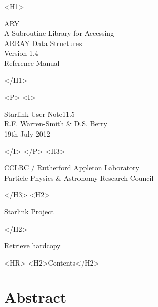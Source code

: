 \documentclass[twoside,11pt]{article}
\newcommand{\stardoccategory}  {Starlink User Note}
\newcommand{\stardocsource}    {sun\stardocnumber}
\newcommand{\stardocnumber}    {11.5}
\newcommand{\stardocauthors}   {R.F. Warren-Smith \& D.S. Berry}
\newcommand{\stardocdate}      {19th July 2012}
\newcommand{\stardoctitle}     {ARY\\[\latex{2.5ex}]
                                A Subroutine Library for Accessing\\
                                ARRAY Data Structures}
\newcommand{\stardocversion}   {Version 1.4}
\newcommand{\stardocmanual}    {Reference Manual}
\newcommand{\htmladdnormallink}[2]{#1}
\newcommand{\htmladdimg}[1]{}
\newcommand{\htmlref}[2]{#1}
\newcommand{\htmladdtonavigation}[1]{}
\newcommand{\xlabel}[1]{}
\newcommand{\latex}[1]{#1}
\newcommand{\latexonlytoc}[0]{\tableofcontents}
\begin{document}
\begin{htmlonly}
   \xlabel{}
   \begin{rawhtml} <H1> \end{rawhtml}
      \stardoctitle\\
      \stardocversion\\
      \stardocmanual
   \begin{rawhtml} </H1> \end{rawhtml}


   \begin{rawhtml} <P> <I> \end{rawhtml}
   \stardoccategory \stardocnumber \\
   \stardocauthors \\
   \stardocdate
   \begin{rawhtml} </I> </P> <H3> \end{rawhtml}
      \htmladdnormallink{CCLRC}{http://www.cclrc.ac.uk} /
      \htmladdnormallink{Rutherford Appleton Laboratory}
                        {http://www.cclrc.ac.uk/ral} \\
      \htmladdnormallink{Particle Physics \& Astronomy Research Council}
                        {http://www.pparc.ac.uk} \\
   \begin{rawhtml} </H3> <H2> \end{rawhtml}
      \htmladdnormallink{Starlink Project}{http://www.starlink.ac.uk/}
   \begin{rawhtml} </H2> \end{rawhtml}
   \htmladdnormallink{\htmladdimg{source.gif} Retrieve hardcopy}
      {http://www.starlink.ac.uk/cgi-bin/hcserver?\stardocsource}\\

  \label{stardoccontents}
  \begin{rawhtml}
    <HR>
    <H2>Contents</H2>
  \end{rawhtml}
  \renewcommand{\latexonlytoc}[0]{}
  \htmladdtonavigation{\htmlref{\htmladdimg{contents_motif.gif}}
        {stardoccontents}}

  \section{\xlabel{abstract}Abstract}
\end{htmlonly}
\end{document}
